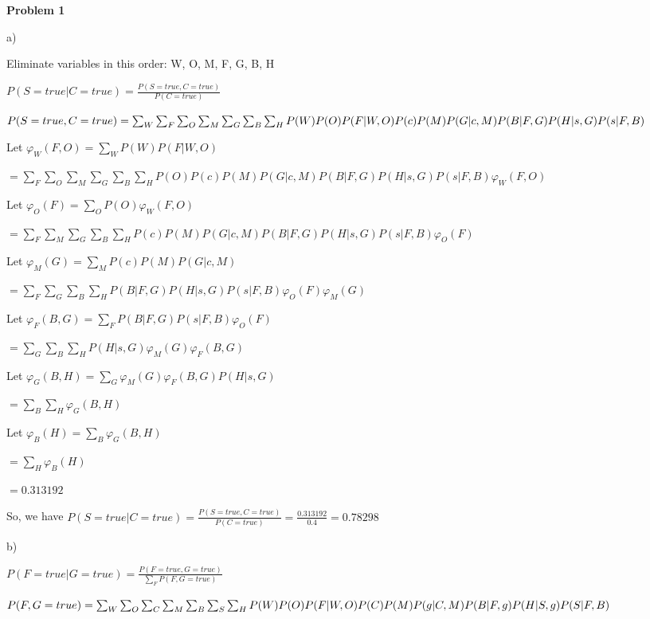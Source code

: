 \documentclass[12pt]{article}
\begin{document}
\noindent

\textbf{Problem 1}

a) 

Eliminate variables in this order: W, O, M, F, G, B, H

$P(S = true \vert C = true) = \frac{P(S = true, C = true)}{P(C = true)}$

$P(S = true, C = true) = \sum_W\sum_F\sum_O\sum_M\sum_G\sum_B\sum_H P(W)P(O)P(F\vert W, O)P(c)P(M)P(G \vert c, M)\\P(B \vert F, G)P(H \vert s, G)P(s \vert F, B)$

Let $\varphi_W(F, O) = \sum_W P(W)P(F \vert W, O)$

$= \sum_F\sum_O\sum_M\sum_G\sum_B\sum_H P(O)P(c)P(M)P(G \vert c, M)P(B \vert F, G)P(H \vert s, G)P(s \vert F, B)\varphi_W(F, O)$

Let $\varphi_O(F) = \sum_O P(O)\varphi_W(F, O)$

$= \sum_F\sum_M\sum_G\sum_B\sum_H P(c)P(M)P(G \vert c, M)P(B \vert F, G)P(H \vert s, G)P(s \vert F, B)\varphi_O(F)$

Let $\varphi_M(G) = \sum_M P(c)P(M)P(G \vert c, M)$

$= \sum_F\sum_G\sum_B\sum_H P(B \vert F, G)P(H \vert s, G)P(s \vert F, B)\varphi_O(F)\varphi_M(G)$

Let $\varphi_F(B, G) = \sum_F P(B \vert F, G)P(s \vert F, B)\varphi_O(F)$

$= \sum_G\sum_B\sum_H P(H \vert s, G)\varphi_M(G)\varphi_F(B, G)$

Let $\varphi_G(B, H) = \sum_G \varphi_M(G)\varphi_F(B, G)P(H \vert s, G)$

$= \sum_B\sum_H \varphi_G(B, H)$

Let $\varphi_B(H) = \sum_B \varphi_G(B, H)$

$= \sum_H \varphi_B(H)$

$= 0.313192$

So, we have $P(S = true \vert C = true) = \frac{P(S = true, C = true)}{P(C = true)} = \frac{0.313192}{0.4} = \mathbf{0.78298}$

b) 

$P(F = true \vert G = true) = \frac{P(F = true, G = true)}{\sum_F P(F, G = true)}$

$P(F, G = true) = \sum_W\sum_O\sum_C\sum_M\sum_B\sum_S\sum_H P(W)P(O)P(F\vert W, O)P(C)P(M)P(g \vert C, M)\\P(B \vert F, g)P(H \vert S, g)P(S \vert F, B)$
\end{document}
